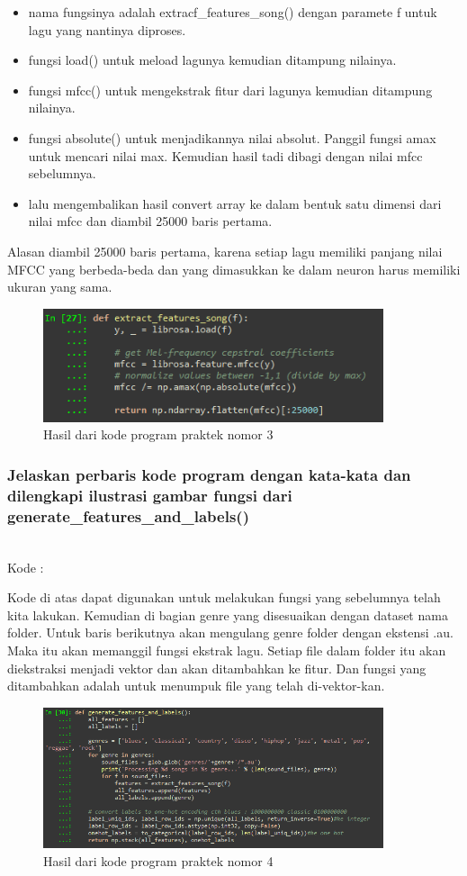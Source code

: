 \begin{itemize}
	\item nama fungsinya adalah extracf\_features\_song() dengan paramete f untuk lagu yang nantinya diproses.
	\item fungsi load() untuk meload lagunya kemudian ditampung nilainya.
	\item fungsi mfcc() untuk mengekstrak fitur dari lagunya kemudian ditampung nilainya.
	\item fungsi absolute() untuk menjadikannya nilai absolut. Panggil fungsi amax untuk mencari nilai max. Kemudian hasil tadi dibagi dengan nilai mfcc sebelumnya.
	\item lalu mengembalikan hasil convert array ke dalam bentuk satu dimensi dari nilai mfcc dan diambil 25000 baris pertama.
\end{itemize}
Alasan diambil 25000 baris pertama, karena setiap lagu memiliki panjang nilai MFCC yang berbeda-beda dan yang dimasukkan ke dalam neuron harus memiliki ukuran yang sama.
\begin{figure}[H]
	\centering
	\includegraphics[width=10cm]{figures/1174083/figures6/22.png}
	\caption{Hasil dari kode program praktek nomor 3}
\end{figure}

\subsubsection{Jelaskan perbaris kode program dengan kata-kata dan dilengkapi ilustrasi gambar fungsi dari generate\_features\_and\_labels()}
\hfill\\
Kode :


Kode di atas dapat digunakan untuk melakukan fungsi yang sebelumnya telah kita lakukan. Kemudian di bagian genre yang disesuaikan dengan dataset nama folder. Untuk baris berikutnya akan mengulang genre folder dengan ekstensi .au. Maka itu akan memanggil fungsi ekstrak lagu. Setiap file dalam folder itu akan diekstraksi menjadi vektor dan akan ditambahkan ke fitur. Dan fungsi yang ditambahkan adalah untuk menumpuk file yang telah di-vektor-kan.
\begin{figure}[H]
	\centering
	\includegraphics[width=10cm]{figures/1174083/figures6/23.png}
	\caption{Hasil dari kode program praktek nomor 4}
\end{figure}

